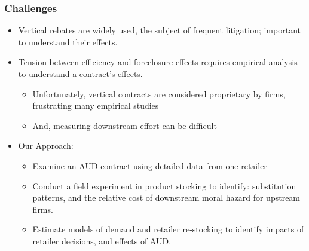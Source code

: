 \documentclass[aspectratio=169]{beamer}
\begin{document}
\begin{frame}\frametitle{Challenges}
\begin{itemize}
\item Vertical rebates are widely used, the subject of frequent litigation; important to understand their effects.
\item Tension between efficiency and foreclosure effects requires empirical analysis to understand a contract's effects.
\begin{itemize}
\item Unfortunately, vertical contracts are considered proprietary by firms, frustrating many empirical studies
\item And, measuring downstream effort can be difficult
\end{itemize}
\item Our Approach:
\begin{itemize}
\item Examine an AUD contract using detailed data from one retailer
\item Conduct a field experiment in product stocking to identify: substitution patterns, and the relative cost of downstream moral hazard for upstream firms.
\item Estimate models of demand and retailer re-stocking to identify impacts of retailer decisions, and effects of AUD.
\end{itemize}
\end{itemize}
\end{frame}
\end{document}
